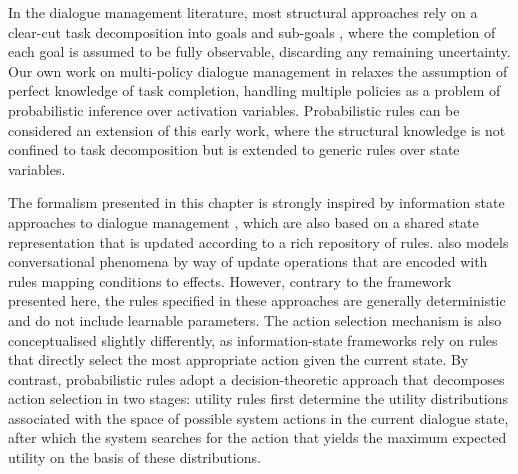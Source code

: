 In the dialogue management literature, most structural approaches rely on a clear-cut task decomposition into goals and sub-goals \citep{Allen:2000:AGD:973935.973937,Steedman-Petrick:07,Bohus:2009}, where the completion of each goal is assumed to be fully observable, discarding any remaining uncertainty.  Our own work on multi-policy dialogue management in \cite{multipolicy-sigdial2011} relaxes the assumption of perfect knowledge of task completion, handling multiple policies as a problem of probabilistic inference over activation variables.  Probabilistic rules can be considered an extension of this early work, where the structural knowledge is not confined to task decomposition but is extended to generic rules over state variables.  

The formalism presented in this chapter is strongly inspired by information state approaches to dialogue management \citep{Larsson:2000,Bos2003}, which are also based on a shared state representation that is updated according to a rich repository of rules.  \cite{Ginzburg2012} also models conversational phenomena by way of update operations that are encoded with rules mapping conditions to effects. However, contrary to the framework presented here, the rules specified in these approaches are generally deterministic and do not include learnable parameters. The action selection mechanism is also conceptualised slightly differently, as information-state frameworks rely on rules that directly select the most appropriate action given the current state. By contrast, probabilistic rules adopt a decision-theoretic approach that decomposes action selection in two stages: utility rules first determine the utility distributions associated with the space of possible system actions in the current dialogue state, after which the system searches for the action that yields the maximum expected utility on the basis of these distributions.  

